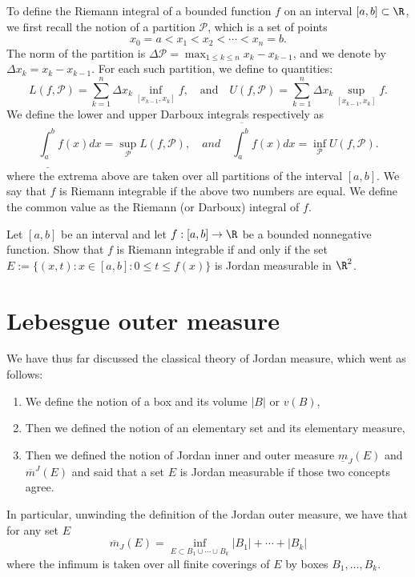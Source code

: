 \documentclass[lang=cn,11pt]{template}
\begin{document}
 To define the Riemann integral of a {bounded} function $f$ on an interval $[a,b]\subset \R$, we first recall the notion of a partition $\mathcal P$, which is a set of points $$x_0=a<x_1<x_2<\cdots <x_n=b.$$ The norm of the partition is $\Delta \mathcal P=\max_{1\leq k \leq n} x_k-x_{k-1}$, and we denote by $\Delta x_k=x_k-x_{k-1}$. For each such partition, we define to quantities:
 $$
 L(f, \mathcal P)=\sum_{k=1}^n  \Delta x_k \inf_{[x_{k-1}, x_k]} f, \quad \text{and} \quad U(f, \mathcal P)=\sum_{k=1}^n \Delta x_k \sup_{[x_{k-1}, x_k]} f.
 $$
We define the lower and upper Darboux integrals respectively as
 $$
 \underline{\int_a^b} f(x) dx=\sup_{\mathcal P} L(f, \mathcal P), \quad and \quad \overline{\int_a^b} f(x) dx=\inf_{\mathcal P} U(f, \mathcal P).
 $$
 where the extrema above are taken over all partitions of the interval $[a,b]$. We say that $f$ is Riemann integrable if the above two numbers are equal. We define the common value as the Riemann (or Darboux) integral of $f$.
 
 Let $[a,b]$ be an interval and let $f:[a,b]\to \R$ be a bounded nonnegative function. Show that $f$ is Riemann integrable if and only if the set $E:=\{(x,t): x\in [a,b]: 0\leq t \leq f(x)\}$ is Jordan measurable in $\R^2$.



\newpage
\chapter{Lebesgue outer measure}


 We have thus far discussed the classical theory of Jordan measure, which went as follows:
 \begin{enumerate}
 \item We define the notion of a box and its volume $|B|$ or $v(B)$,
 \item Then we defined the notion of an elementary set and its elementary measure,
 \item Then we defined the notion of Jordan inner and outer measure $\underline m_J(E)$ and $\overline m^J(E)$ and said that a set $E$ is Jordan measurable if those two concepts agree. 
 \end{enumerate}

 In particular, unwinding the definition of the Jordan outer measure, we have that for any set $E$
 $$
 \overline{m}_J(E)= \inf_{E\subset B_1 \cup \cdots \cup B_k} |B_1|+\cdots+|B_k|
 $$
 where the infimum is taken over all finite coverings of $E$ by boxes $B_1, \ldots, B_k$.
\end{document}
